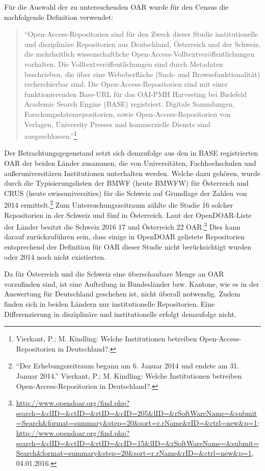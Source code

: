 \documentclass[a4paper,
fontsize=11pt,
oneside,
numbers=noperiodatend,
parskip=half-,
bibliography=totoc,
final
]{scrartcl}
\begin{document}
Für die Auswahl der zu untersuchenden OAR wurde für den Census die
nachfolgende Definition verwendet:

\begin{quote}
\enquote{Open-Access-Repositorien sind für den Zweck dieser Studie
institutionelle und disziplinäre Repositorien aus Deutschland,
Österreich und der Schweiz, die mehrheitlich wissenschaftliche
Open-Access-Volltextveröffentlichungen vorhalten. Die
Volltextveröffentlichungen sind durch Metadaten beschrieben, die über
eine Weboberfläche (Such- und Browsefunktionalität) recherchierbar sind.
Die Open-Access-Repositorien sind mit einer funktionierenden Base-URL
für das OAI-PMH Harvesting bei Bielefeld Academic Search Engine (BASE)
registriert. Digitale Sammlungen, Forschungsdatenrepositorien, sowie
Open-Access-Repositorien von Verlagen, University Presses und
kommerzielle Dienste sind ausgeschlossen.}\footnote{Vierkant, P.; M.
  Kindling: Welche Institutionen betreiben Open-Access-Repositorien in
  Deutschland?.}
\end{quote}

Der Betrachtungsgegenstand setzt sich demzufolge aus den in BASE
registrierten OAR der beiden Länder zusammen, die von Universitäten,
Fachhochschulen und außeruniversitären Institutionen unterhalten werden.
Welche dazu gehören, wurde durch die Typisierungslisten der BMWF (heute
BMWFW) für Österreich und CRUS (heute swissuniversities) für die Schweiz
auf Grundlage der Zahlen von 2014 ermittelt.\footnote{\enquote{Der
  Erhebungszeitraum begann am 6. Januar 2014 und endete am 31. Januar
  2014.} Vierkant, P.; M. Kindling: Welche Institutionen betreiben
  Open-Access-Repositorien in Deutschland?.} Zum Untersuchungszeitraum
zählte die Studie 16 solcher Repositorien in der Schweiz und fünf in
Österreich. Laut der OpenDOAR-Liste der Länder besitzt die Schweiz 2016
17 und Österreich 22 OAR.\footnote{\url{http://www.opendoar.org/find.php?search=\&clID=\&ctID=\&rtID=\&cID=205\&lID=\&rSoftWareName=\&submit=Search\&format=summary\&step=20\&sort=r.rName\&rID=\&ctrl=new\&p=1};
  \url{http://www.opendoar.org/find.php?search=\&clID=\&ctID=\&rtID=\&cID=15\&lID=\&rSoftWareName=\&submit=Search\&format=summary\&step=20\&sort=r.rName\&rID=\&ctrl=new\&p=1},
  04.01.2016.} Dies kann darauf zurückzuführen sein, dass einige in
OpenDOAR gelistete Repositorien entsprechend der Definition für OAR
dieser Studie nicht berücksichtigt wurden oder 2014 noch nicht
existierten.

Da für Österreich und die Schweiz eine überschaubare Menge an OAR
vorzufinden sind, ist eine Aufteilung in Bundesländer bzw. Kantone, wie
es in der Auswertung für Deutschland geschehen ist, nicht überall
notwendig. Zudem finden sich in beiden Ländern nur institutionelle
Repositorien. Eine Differenzierung in disziplinäre und institutionelle
erfolgt demzufolge nicht.
\end{document}
